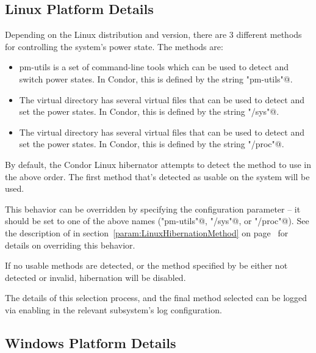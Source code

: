 \subsection{Linux Platform Details}

Depending on the Linux distribution and version, there are 3 different
methods for controlling the system's power state.  The methods are:
\begin{itemize}
\item pm-utils is a set of command-line tools which can be used to
  detect and switch power states.
  In Condor, this is defined by the string \verb@"pm-utils"@.
\item The  virtual directory has several virtual files that
  can be used to detect and set the power states.
  In Condor, this is defined by the string \verb@"/sys"@.
\item The  virtual directory has several virtual files that
  can be used to detect and set the power states.
  In Condor, this is defined by the string \verb@"/proc"@.
\end{itemize}

By default, the Condor Linux hibernator attempts to detect the method
to use in the above order.  The first method that's detected as usable
on the system will be used.

This behavior can be overridden by specifying the
 configuration parameter -- it
should be set to one of the above names
(\verb@"pm-utils"@, \verb@"/sys"@, or \verb@"/proc"@).
See the description of  in
section~\ref{param:LinuxHibernationMethod} on
page~\pageref{param:LinuxHibernationMethod}
for details on overriding this behavior.

If no usable methods are detected, or the method specified by
 be either not detected or
invalid, hibernation will be disabled.

The details of this selection process, and the final method selected
can be logged via enabling  in the relevant
subsystem's log configuration.


\subsection{Windows Platform Details}

